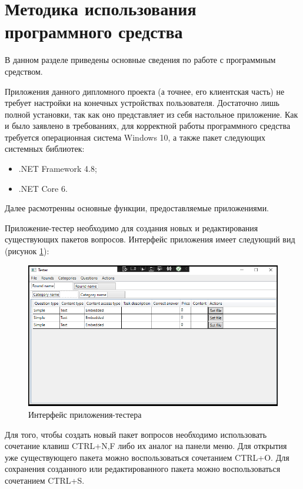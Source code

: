 \section{Методика использования программного средства}
\label{sec:manual}

В данном разделе приведены основные сведения по работе с программным средством. 

Приложения данного дипломного проекта (а точнее, его клиентская часть) не требует настройки на конечных устройствах пользователя. Достаточно лишь
полной установки, так как оно представляет из себя настольное приложение. Как и было заявлено в требованиях, для корректной работы программного средства
требуется операционная система Windows 10, а также пакет следующих системных библиотек:
\begin{itemize}
	\item .NET Framework 4.8;
	\item .NET Core 6.
\end{itemize} 

Далее расмотренны основные функции, предоставляемые приложениями.

Приложение-тестер необходимо для создания новых и редактирования существующих пакетов вопросов. Интерфейс приложения имеет следующий вид (рисунок \ref{sec:manual:tester}): 

\begin{figure}[!ht]
    \centering
    \includegraphics[scale=0.75]{attachments/tester.png}
    \caption{Интерфейс приложения-тестера}
    \label{sec:manual:tester}
\end{figure}

Для того, чтобы создать новый пакет вопросов необходимо использовать сочетание клавиш CTRL+N,F либо их аналог на панели меню. Для открытия уже существующего пакета можно 
воспользоваться сочетанием CTRL+O. Для сохранения созданного или редактированного пакета можно воспользоваться сочетанием CTRL+S.

